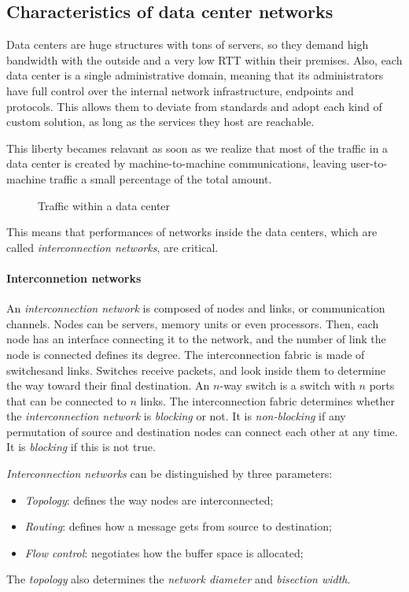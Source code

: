 \subsection{Characteristics of data center networks}
Data centers are huge structures with tons of servers, so they demand high
bandwidth with the outside and a very low RTT within their premises. Also,
each data center is a single administrative domain, meaning that its
administrators have full control over the internal network infrastructure, 
endpoints and protocols. This allows them to deviate from standards and adopt
each kind of custom solution, as long as the services they host are reachable.

This liberty becames relavant as soon as we realize that most of the traffic
in a data center is created by machine-to-machine communications, leaving
user-to-machine traffic a small percentage of the total amount. 

\begin{figure}[h!]
    \centering
    \caption{Traffic within a data center}
\end{figure}

\noindent
This means that performances of networks inside the data centers, which
are called \emph{interconnection networks}, are critical.

\paragraph{Interconnetion networks}
An \emph{interconnection network} is composed of nodes and links, or communication
channels. Nodes can be servers, memory units or even processors. Then, each node
has an interface connecting it to the network, and the number of link the node
is connected defines its degree. The interconnection fabric is made of
switches\footnotemark and links. Switches receive packets, and look inside them
to determine the way toward their final destination. An $n$-way switch is a
switch with $n$ ports that can be connected to $n$ links. The interconnection
fabric determines whether the \emph{interconnection network} is \emph{blocking}
or not. It is \emph{non-blocking} if any permutation of source and destination
nodes can connect each other at any time. It is \emph{blocking} if this is not
true.


\bigskip\noindent
\emph{Interconnection networks} can be distinguished by three parameters:
\begin{itemize}
    \item \emph{Topology}: defines the way nodes are interconnected;
    \item \emph{Routing}: defines how a message gets from source to destination;
    \item \emph{Flow control}: negotiates how the buffer space is allocated;
\end{itemize}
The \emph{topology} also determines the \emph{network diameter} and
\emph{bisection width}.

